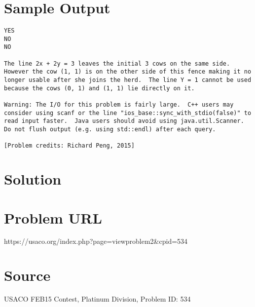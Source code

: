 \documentclass[12pt]{article}
\begin{document}
\section*{Sample Output}
\begin{verbatim}
YES
NO
NO

The line 2x + 2y = 3 leaves the initial 3 cows on the same side.  However the cow (1, 1) is on the other side of this fence making it no longer usable after she joins the herd.  The line Y = 1 cannot be used because the cows (0, 1) and (1, 1) lie directly on it.

Warning: The I/O for this problem is fairly large.  C++ users may consider using scanf or the line "ios_base::sync_with_stdio(false)" to read input faster.  Java users should avoid using java.util.Scanner.  Do not flush output (e.g. using std::endl) after each query.

[Problem credits: Richard Peng, 2015]
\end{verbatim}

\section*{Solution}


\section*{Problem URL}
https://usaco.org/index.php?page=viewproblem2&cpid=534

\section*{Source}
USACO FEB15 Contest, Platinum Division, Problem ID: 534
\end{document}
